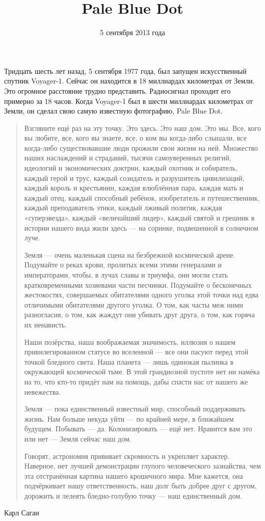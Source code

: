 \documentclass[pdftex,12pt,a4paper]{article}
\title{Pale Blue Dot}
\author{5 сентября 2013 года}
\date{}
\begin{document}

\begin{titlepage}

\maketitle

{\footnotesize  Тридцать шесть лет назад, 5 сентября 1977 года, был запущен искусственный спутник Voyager-1. Сейчас он находится в 18 миллиардах километрах от Земли. Это огромное расстояние трудно представить. Радиосигнал проходит его примерно за 18 часов. Когда Voyager-1 был в шести миллиардах километрах от Земли, он сделал свою самую известную фотографию, Pale Blue Dot. }

\bigskip 

\begin{quotation}
Взгляните ещё раз на эту точку. Это здесь. Это наш дом. Это мы. Все, кого вы любите, все, кого вы знаете, все, о ком вы когда-либо слышали, все когда-либо существовавшие люди прожили свои жизни на ней. Множество наших наслаждений и страданий, тысячи самоуверенных религий, идеологий и экономических доктрин, каждый охотник и собиратель, каждый герой и трус, каждый созидатель и разрушитель цивилизаций, каждый король и крестьянин, каждая влюблённая пара, каждая мать и каждый отец, каждый способный ребёнок, изобретатель и путешественник, каждый преподаватель этики, каждый лживый политик, каждая «суперзвезда», каждый «величайший лидер», каждый святой и грешник в истории нашего вида жили здесь — на соринке, подвешенной в солнечном луче.

Земля — очень маленькая сцена на безбрежной космической арене. Подумайте о реках крови, пролитых всеми этими генералами и императорами, чтобы, в лучах славы и триумфа, они могли стать кратковременными хозяевами части песчинки. Подумайте о бесконечных жестокостях, совершаемых обитателями одного уголка этой точки над едва отличимыми обитателями другого уголка. О том, как часты меж ними разногласия, о том, как жаждут они убивать друг друга, о том, как горяча их ненависть.

Наши позёрства, наша воображаемая значимость, иллюзия о нашем привилегированном статусе во вселенной — все они пасуют перед этой точкой бледного света. Наша планета — лишь одинокая пылинка в окружающей космической тьме. В этой грандиозной пустоте нет ни намёка на то, что кто-то придёт нам на помощь, дабы спасти нас от нашего же невежества.

Земля — пока единственный известный мир, способный поддерживать жизнь. Нам больше некуда уйти — по крайней мере, в ближайшем будущем. Побывать — да. Колонизировать — ещё нет. Нравится вам это или нет — Земля сейчас наш дом.

Говорят, астрономия прививает скромность и укрепляет характер. Наверное, нет лучшей демонстрации глупого человеческого зазнайства, чем эта отстранённая картина нашего крошечного мира. Мне кажется, она подчёркивает нашу ответственность, наш долг быть добрее друг с другом, дорожить и лелеять бледно-голубую точку — наш единственный дом.
\end{quotation}
Карл Саган

\end{titlepage}
\end{document}
